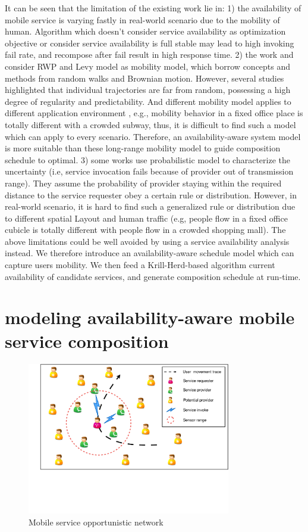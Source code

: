 \documentclass[journal]{IEEEtran}
\begin{document}
It can be seen that the limitation of the existing work lie in: 1) the availability of mobile service is varying fastly in real-world scenario due to the mobility of human. Algorithm which doesn't consider service availability as optimization objective or consider service availability is full stable may lead to high invoking fail rate, and recompose after fail result in high response time. 2) the work \cite{sadiq2015service} and \cite{Deng2017} consider RWP and  Levy model as mobility model, which borrow concepts and methods from random walks and Brownian motion. However, several studies \cite{barbosa2017human} \cite{bettstetter2003node} \cite{navidi2004improving} highlighted that individual trajectories are far from random, possessing a high degree of regularity and predictability. And different mobility model applies to different application environment \cite{camp2002survey}, e.g., mobility behavior in a fixed office place is totally different with a crowded subway, thus, it is difficult to find such a model which can apply to every scenario. Therefore, an availability-aware system model is more suitable than these long-range mobility model to guide composition schedule to optimal. 
3) some works \cite{wang2011exploiting} \cite{Deng2016-2} use probabilistic model to characterize the uncertainty (i.e, service invocation fails because of provider out of transmission range). They assume the probability of provider staying within the required distance to the service requester obey a certain rule or distribution. However, in real-world scenario, it is hard to find such a generalized rule or distribution due to different spatial Layout and human traffic (e.g, people flow in a fixed office cubicle is totally different with people flow in a crowded shopping mall). 
The above limitations could be well avoided by using a service availability analysis instead. We therefore introduce an availability-aware schedule model which can capture users mobility. We then feed a Krill-Herd-based algorithm current availability of candidate services, and generate composition schedule at run-time.

\section{modeling availability-aware mobile service composition}
\begin{figure}[!t]
\centering
\includegraphics[width=3.5in]{./img/pic2.pdf}
\caption{Mobile service opportunistic network}
\label{fig_mson}
\end{figure}
\end{document}
